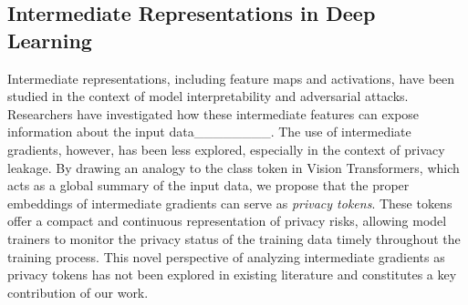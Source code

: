 \subsection{Intermediate Representations in Deep Learning}
Intermediate representations, including feature maps and activations, have been studied in the context of model interpretability and adversarial attacks. Researchers have investigated how these intermediate features can expose information about the input data________. The use of intermediate gradients, however, has been less explored, especially in the context of privacy leakage. By drawing an analogy to the class token in Vision Transformers, which acts as a global summary of the input data, we propose that the proper embeddings of intermediate gradients can serve as \textit{privacy tokens}. These tokens offer a compact and continuous representation of privacy risks, allowing model trainers to monitor the privacy status of the training data timely throughout the training process. This novel perspective of analyzing intermediate gradients as privacy tokens has not been explored in existing literature and constitutes a key contribution of our work.



